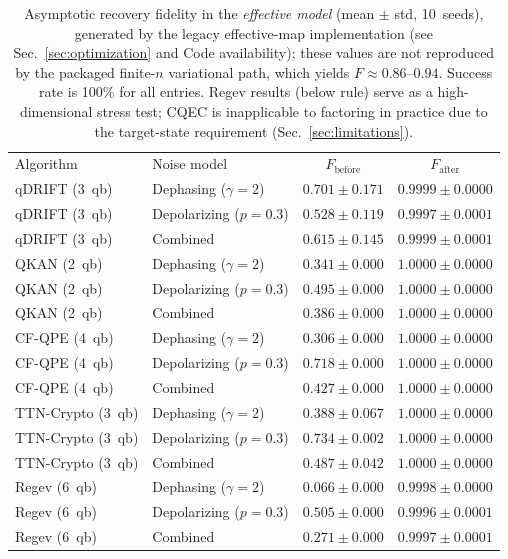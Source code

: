 \documentclass[pra,twocolumn,superscriptaddress,longbibliography,floatfix]{revtex4-2}
\begin{document}
\begin{table}[t]
\caption{Asymptotic recovery fidelity in the \emph{effective model} (mean $\pm$ std, 10~seeds), generated by the legacy effective-map implementation (see Sec.~\ref{sec:optimization} and Code availability); these values are not reproduced by the packaged finite-$n$ variational path, which yields $F \approx 0.86$--$0.94$. Success rate is 100\% for all entries. Regev results (below rule) serve as a high-dimensional stress test; CQEC is inapplicable to factoring in practice due to the target-state requirement (Sec.~\ref{sec:limitations}).}
\label{tab:main}
\begin{ruledtabular}
\begin{tabular}{llcc}
Algorithm & Noise model & $F_\mathrm{before}$ & $F_\mathrm{after}$ \\
\colrule
qDRIFT (3~qb) & Dephasing ($\gamma=2$) & $0.701 \pm 0.171$ & $0.9999 \pm 0.0000$ \\
qDRIFT (3~qb) & Depolarizing ($p=0.3$) & $0.528 \pm 0.119$ & $0.9997 \pm 0.0001$ \\
qDRIFT (3~qb) & Combined & $0.615 \pm 0.145$ & $0.9999 \pm 0.0001$ \\
QKAN (2~qb) & Dephasing ($\gamma=2$) & $0.341 \pm 0.000$ & $1.0000 \pm 0.0000$ \\
QKAN (2~qb) & Depolarizing ($p=0.3$) & $0.495 \pm 0.000$ & $1.0000 \pm 0.0000$ \\
QKAN (2~qb) & Combined & $0.386 \pm 0.000$ & $1.0000 \pm 0.0000$ \\
CF-QPE (4~qb) & Dephasing ($\gamma=2$) & $0.306 \pm 0.000$ & $1.0000 \pm 0.0000$ \\
CF-QPE (4~qb) & Depolarizing ($p=0.3$) & $0.718 \pm 0.000$ & $1.0000 \pm 0.0000$ \\
CF-QPE (4~qb) & Combined & $0.427 \pm 0.000$ & $1.0000 \pm 0.0000$ \\
TTN-Crypto (3~qb) & Dephasing ($\gamma=2$) & $0.388 \pm 0.067$ & $1.0000 \pm 0.0000$ \\
TTN-Crypto (3~qb) & Depolarizing ($p=0.3$) & $0.734 \pm 0.002$ & $1.0000 \pm 0.0000$ \\
TTN-Crypto (3~qb) & Combined & $0.487 \pm 0.042$ & $1.0000 \pm 0.0000$ \\
\colrule
Regev (6~qb) & Dephasing ($\gamma=2$) & $0.066 \pm 0.000$ & $0.9998 \pm 0.0000$ \\
Regev (6~qb) & Depolarizing ($p=0.3$) & $0.505 \pm 0.000$ & $0.9996 \pm 0.0001$ \\
Regev (6~qb) & Combined & $0.271 \pm 0.000$ & $0.9997 \pm 0.0001$ \\
\end{tabular}
\end{ruledtabular}
\end{table}
\end{document}
